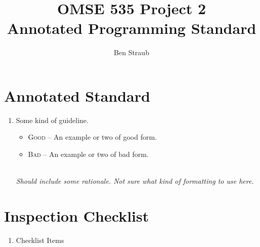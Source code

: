\documentclass[11pt]{article}
\begin{document}
\title{OMSE 535 Project 2 \\ Annotated Programming Standard}
\author{Ben Straub}
\maketitle



\section{Annotated Standard}

\begin{enumerate}
\item Some kind of guideline.
  \begin{itemize}
  \item \textsc{Good} -- An example or two of good form.
  \item \textsc{Bad} -- An example or two of bad form.
  \end{itemize}
   \\ {\it Should include some rationale.  Not sure what kind of formatting to use here. }
\end{enumerate}



\clearpage
\section{Inspection Checklist}

\begin{enumerate}[\ensuremath{\square}]
  \item Checklist Items
\end{enumerate}
\end{document}
